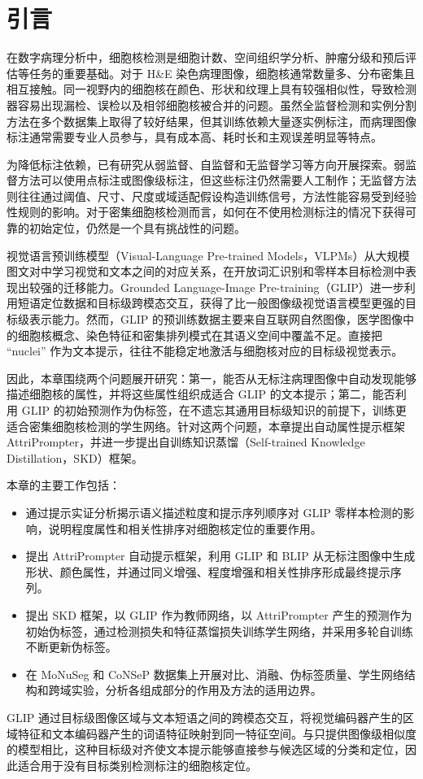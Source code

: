 \section{引言}

在数字病理分析中，细胞核检测是细胞计数、空间组织学分析、肿瘤分级和预后评估等任务的重要基础。对于 H\&E 染色病理图像，细胞核通常数量多、分布密集且相互接触。同一视野内的细胞核在颜色、形状和纹理上具有较强相似性，导致检测器容易出现漏检、误检以及相邻细胞核被合并的问题。虽然全监督检测和实例分割方法在多个数据集上取得了较好结果，但其训练依赖大量逐实例标注，而病理图像标注通常需要专业人员参与，具有成本高、耗时长和主观误差明显等特点。

为降低标注依赖，已有研究从弱监督、自监督和无监督学习等方向开展探索。弱监督方法可以使用点标注或图像级标注，但这些标注仍然需要人工制作；无监督方法则往往通过阈值、尺寸、尺度或域适配假设构造训练信号，方法性能容易受到经验性规则的影响。对于密集细胞核检测而言，如何在不使用检测标注的情况下获得可靠的初始定位，仍然是一个具有挑战性的问题。

视觉语言预训练模型（Visual-Language Pre-trained Models，VLPMs）从大规模图文对中学习视觉和文本之间的对应关系，在开放词汇识别和零样本目标检测中表现出较强的迁移能力。Grounded Language-Image Pre-training（GLIP）进一步利用短语定位数据和目标级跨模态交互，获得了比一般图像级视觉语言模型更强的目标级表示能力。然而，GLIP 的预训练数据主要来自互联网自然图像，医学图像中的细胞核概念、染色特征和密集排列模式在其语义空间中覆盖不足。直接把 ``nuclei'' 作为文本提示，往往不能稳定地激活与细胞核对应的目标级视觉表示。

因此，本章围绕两个问题展开研究：第一，能否从无标注病理图像中自动发现能够描述细胞核的属性，并将这些属性组织成适合 GLIP 的文本提示；第二，能否利用 GLIP 的初始预测作为伪标签，在不遗忘其通用目标级知识的前提下，训练更适合密集细胞核检测的学生网络。针对这两个问题，本章提出自动属性提示框架 AttriPrompter，并进一步提出自训练知识蒸馏（Self-trained Knowledge Distillation，SKD）框架。

本章的主要工作包括：
\begin{itemize}
  \item 通过提示实证分析揭示语义描述粒度和提示序列顺序对 GLIP 零样本检测的影响，说明程度属性和相关性排序对细胞核定位的重要作用。
  \item 提出 AttriPrompter 自动提示框架，利用 GLIP 和 BLIP 从无标注图像中生成形状、颜色属性，并通过同义增强、程度增强和相关性排序形成最终提示序列。
  \item 提出 SKD 框架，以 GLIP 作为教师网络，以 AttriPrompter 产生的预测作为初始伪标签，通过检测损失和特征蒸馏损失训练学生网络，并采用多轮自训练不断更新伪标签。
  \item 在 MoNuSeg 和 CoNSeP 数据集上开展对比、消融、伪标签质量、学生网络结构和跨域实验，分析各组成部分的作用及方法的适用边界。


\end{itemize}
  GLIP 通过目标级图像区域与文本短语之间的跨模态交互，将视觉编码器产生的区域特征和文本编码器产生的词语特征映射到同一特征空间。与只提供图像级相似度的模型相比，这种目标级对齐使文本提示能够直接参与候选区域的分类和定位，因此适合用于没有目标类别检测标注的细胞核定位。

